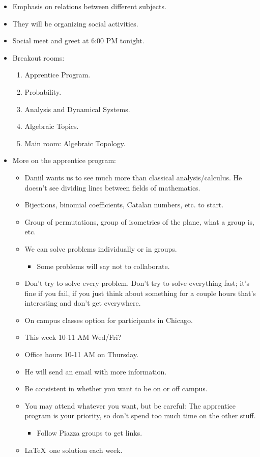 \documentclass[../apprentice.tex]{subfiles}
\begin{document}
\begin{itemize}
\begin{itemize}
\begin{itemize}
        \end{itemize}
    \end{itemize}
    \item Emphasis on relations between different subjects.
    \item They will be organizing social activities.
    \item Social meet and greet at 6:00 PM tonight.
    \item Breakout rooms:
    \begin{enumerate}
        \item Apprentice Program.
        \item Probability.
        \item Analysis and Dynamical Systems.
        \item Algebraic Topics.
        \item Main room: Algebraic Topology.
    \end{enumerate}
    \item More on the apprentice program:
    \begin{itemize}
        \item Daniil wants us to see much more than classical analysis/calculus. He doesn't see dividing lines between fields of mathematics.
        \item Bijections, binomial coefficients, Catalan numbers, etc. to start.
        \item Group of permutations, group of isometries of the plane, what a group is, etc.
        \item We can solve problems individually or in groups.
        \begin{itemize}
            \item Some problems will say not to collaborate.
        \end{itemize}
        \item Don't try to solve every problem. Don't try to solve everything fast; it's fine if you fail, if you just think about something for a couple hours that's interesting and don't get everywhere.
        \item On campus classes option for participants in Chicago.
        \item This week 10-11 AM Wed/Fri?
        \item Office hours 10-11 AM on Thursday.
        \item He will send an email with more information.
        \item Be consistent in whether you want to be on or off campus.
        \item You may attend whatever you want, but be careful: The apprentice program is your priority, so don't spend too much time on the other stuff.
        \begin{itemize}
            \item Follow Piazza groups to get links.
        \end{itemize}
        \item \LaTeX\ one solution each week.
    \end{itemize}
\end{itemize}
\end{document}
